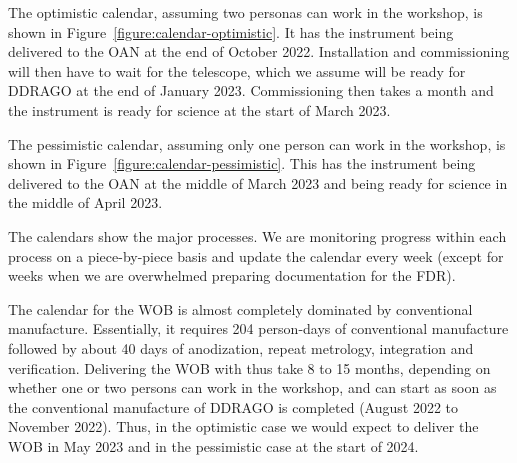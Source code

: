 \documentclass{article}
\begin{document}
The optimistic calendar, assuming two personas can work in the workshop, is shown in Figure~\ref{figure:calendar-optimistic}. It has the instrument being delivered to the OAN at the end of October 2022. Installation and commissioning will then have to wait for the telescope, which we assume will be ready for DDRAGO at the end of January 2023. Commissioning then takes a month and the instrument is ready for science at the start of March 2023.

The pessimistic calendar, assuming only one person can work in the workshop, is shown in Figure~\ref{figure:calendar-pessimistic}. This has the instrument being delivered to the OAN at the middle of March 2023 and being ready for science in the middle of April 2023.

The calendars show the major processes. We are monitoring progress within each process on a piece-by-piece basis and update the calendar every week (except for weeks when we are overwhelmed preparing documentation for the FDR).

The calendar for the WOB is almost completely dominated by conventional manufacture. Essentially, it requires 204 person-days of conventional manufacture followed by about 40 days of anodization, repeat metrology, integration and verification. Delivering the WOB with thus take 8 to 15 months, depending on whether one or two persons can work in the workshop, and can start as soon as the conventional manufacture of DDRAGO is completed (August 2022 to November 2022). Thus, in the optimistic case we would expect to deliver the WOB in May 2023 and in the pessimistic case at the start of 2024.

%
\end{document}
